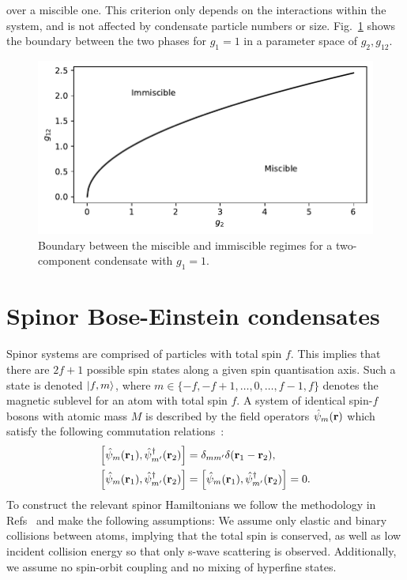 over a miscible one.
This criterion only depends on the interactions within the system, and is not
affected by condensate particle numbers or size.
Fig.~\ref{fig: miscible-vs-immiscible} shows the boundary between the two
phases for \(g_1=1\) in a parameter space of \(g_2, g_{12}\).
\begin{figure}
    \centering
    \includegraphics{gfx/ch-theory/miscible_vs_immiscible.pdf}
    \caption[Two-component miscible vs immiscible boundary]
    {\label{fig: miscible-vs-immiscible}Boundary between the miscible
        and immiscible regimes for a two-component condensate with \(g_1=1\).}
\end{figure}


\section{Spinor Bose-Einstein condensates}
Spinor systems are comprised of particles with total spin \(f\).
This implies that there are \(2f + 1\) possible spin states along a given spin
quantisation axis.
Such a state is denoted \(\ket{f, m} \), where
\(m \in \{-f, -f+1, \ldots, 0, \ldots, f - 1, f\} \) denotes the magnetic
sublevel for an atom with total spin \( f\).
A system of identical spin-\(f\) bosons with atomic mass \(M\) is described by
the field operators \(\hat{\psi}_m(\vb{r})\) which satisfy the following commutation
relations~\cite{Kawaguchi2012}:
\begin{align}
    \left[\hat{\psi}_m(\vb{r}_1), \hat{\psi}^\dagger_{m'}(\vb{r}_2)\right]
    &= \delta_{mm'}\delta(\vb{r}_1 - \vb{r}_2), \\
    \left[\hat{\psi}_m(\vb{r}_1), \hat{\psi}^\dagger_{m'}(\vb{r}_2)\right] &=
    \left[\hat{\psi}_m(\vb{r}_1), \hat{\psi}^\dagger_{m'}(\vb{r}_2)\right] = 0.
\end{align}
To construct the relevant spinor Hamiltonians we follow the methodology in
Refs~\cite{Ho1998,Ohmi1998,Kawaguchi2012,Stamper-Kurn2013,Symes2019} and make
the following assumptions: We assume only elastic and binary collisions between
atoms, implying that the total spin is conserved, as well as low incident
collision energy so that only s-wave scattering is observed.
Additionally, we assume no spin-orbit coupling and no mixing of
hyperfine states.

